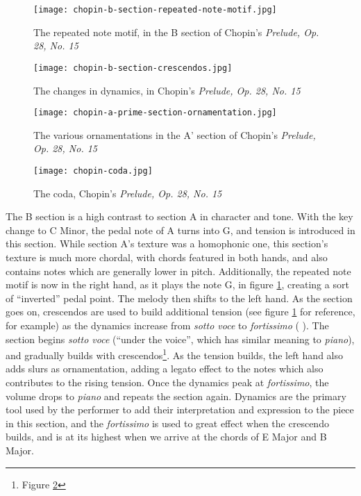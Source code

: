 \begin{figure}
  \centering
  \texttt{[image: chopin-b-section-repeated-note-motif.jpg]}
  \caption{The repeated note motif, in the B section of Chopin's \textit{Prelude, Op. 28, No. 15}}
  \label{fig:chopin-b-section-repeated-note-motif}
\end{figure}

\begin{figure}
  \centering
  \texttt{[image: chopin-b-section-crescendos.jpg]}
  \caption{The changes in dynamics, in Chopin's \textit{Prelude, Op. 28, No. 15}}
  \label{fig:chopin-b-section-crescendos}
\end{figure}

\begin{figure}
  \centering
  \texttt{[image: chopin-a-prime-section-ornamentation.jpg]}
  \caption[Ornamentations in A', Chopin's \textit{Prelude, Op. 28, No. 15}]{The various ornamentations in the A' section of Chopin's \textit{Prelude, Op. 28, No. 15}}
  \label{fig:chopin-a-prime-section-ornamentation}
\end{figure}

\begin{figure}
  \centering
  \texttt{[image: chopin-coda.jpg]}
  \caption{The coda, Chopin's \textit{Prelude, Op. 28, No. 15}}
  \label{fig:chopin-coda}
\end{figure}



The B section is a high contrast to section A in character and tone. With the key change to C\musSharp{} Minor, the pedal note of A\musFlat{} turns into G\musSharp{}, and tension is introduced in this section. While section A's texture was a homophonic one, this section's texture is much more chordal, with chords featured in both hands, and also contains notes which are generally lower in pitch. Additionally, the repeated note motif is now in the right hand, as it plays the note G\musSharp{}, in figure \ref{fig:chopin-b-section-repeated-note-motif}\autocite{Hansen_1973}, creating a sort of ``inverted'' pedal point. The melody then shifts to the left hand. As the section goes on, crescendos are used to build additional tension (see figure \ref{fig:chopin-b-section-repeated-note-motif}\autocite{Hansen_1973} for reference, for example) as the dynamics increase from \textit{sotto voce} to \textit{fortissimo} ( ). The section begins \textit{sotto voce} (``under the voice'', which has similar meaning to \textit{piano}), and gradually builds with crescendos\footnote{Figure \ref{fig:chopin-b-section-crescendos}}\autocite{Hansen_1973}. As the tension builds, the left hand also adds slurs as ornamentation, adding a legato effect to the notes which also contributes to the rising tension. Once the dynamics peak at \textit{fortissimo}, the volume drops to \textit{piano} and repeats the section again. Dynamics are the primary tool used by the performer to add their interpretation and expression to the piece in this section, and the \textit{fortissimo} is used to great effect when the crescendo builds, and is at its highest when we arrive at the chords of E Major and B Major.

